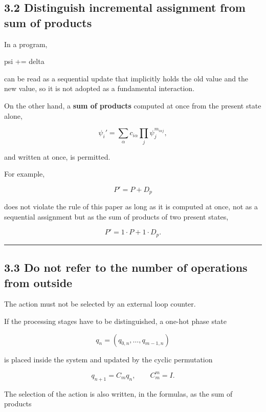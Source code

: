 \documentclass[
  a4paper,
]{article}
\newenvironment{Shaded}{}{}
\newcommand{\NormalTok}[1]{#1}
\begin{document}
\subsection{3.2 Distinguish incremental assignment from sum of
products}\label{distinguish-incremental-assignment-from-sum-of-products}

In a program,

\begin{Shaded}
\begin{Highlighting}[]
\NormalTok{psi += delta}
\end{Highlighting}
\end{Shaded}

can be read as a sequential update that implicitly holds the old value
and the new value, so it is not adopted as a fundamental interaction.

On the other hand, a \textbf{sum of products} computed at once from the
present state alone,

\[
\psi_i'
=
\sum_{\alpha}
c_{i\alpha}
\prod_j \psi_j^{m_{i\alpha j}},
\]

and written at once, is permitted.

For example,

\[
P'=P+D_p
\]

does not violate the rule of this paper as long as it is computed at
once, not as a sequential assignment but as the sum of products of two
present states,

\[
P'=1\cdot P+1\cdot D_p.
\]

\begin{center}\rule{0.5\linewidth}{0.5pt}\end{center}

\subsection{3.3 Do not refer to the number of operations from
outside}\label{do-not-refer-to-the-number-of-operations-from-outside}

The action must not be selected by an external loop counter.

If the processing stages have to be distinguished, a one-hot phase state

\[
q_n=(q_{0,n},\ldots,q_{m-1,n})
\]

is placed inside the system and updated by the cyclic permutation

\[
\boxed{
q_{n+1}=C_m q_n,
\qquad C_m^m=I.
}
\]

The selection of the action is also written, in the formulas, as the sum
of products
\end{document}
